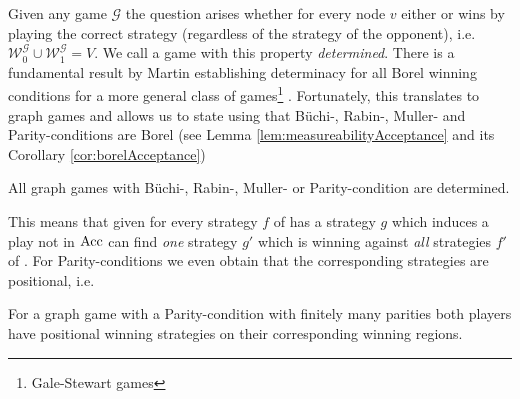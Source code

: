 Given any game $\mathcal{G}$ the question arises whether for every node $v$
either \eve{} or \adam{} wins by playing the correct strategy (regardless of
the strategy of the opponent), i.e. 
$\mathcal{W}^{\mathcal{G}}_{0}\cup\mathcal{W}^{\mathcal{G}}_{1} = V$. We call
a game with this property \emph{determined}. There is a fundamental result by
Martin establishing determinacy for all Borel winning conditions for a more
general class of games\footnote{Gale-Stewart games} \cite{BorelDeterminacy}.
Fortunately, this translates to graph games and allows us to state using that
Büchi-, Rabin-, Muller- and Parity-conditions are Borel (see Lemma
\ref{lem:measureabilityAcceptance} and its Corollary \ref{cor:borelAcceptance})
\begin{theorem}
  \cite[Corollary 2.10]{AutoLogInfGames}
  All graph games with Büchi-, Rabin-, Muller- or Parity-condition are 
  determined.
  \label{thm:boreldet}
\end{theorem}
This means that given for every strategy $f$ of \eve{} \adam{} has a strategy
$g$ which induces a play not in $\operatorname{Acc}$ \adam{} can find \emph{one} strategy
$g'$ which is winning against \emph{all} strategies $f'$ of \eve{}.
For Parity-conditions we even obtain that the corresponding strategies are 
positional, i.e.
\begin{theorem}
  \cite[Theorem 6]{ParityGamesPosDet}
  For a graph game with a Parity-condition with finitely many parities both 
  players have positional winning strategies on their corresponding winning 
  regions.
  \label{thm:posdetparity}
\end{theorem}

